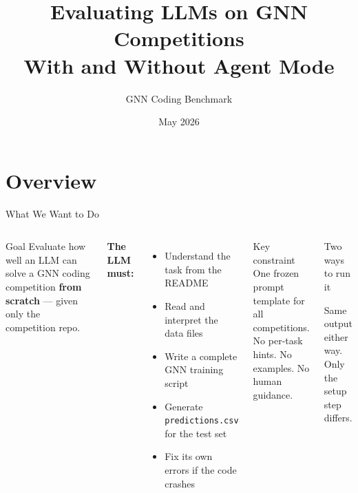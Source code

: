 \documentclass[aspectratio=169,t,10pt]{beamer}
\title[GNN-CB: LLM Evaluation Procedure]{%
  \textbf{Evaluating LLMs on GNN Competitions}\\[4pt]
  \normalsize With and Without Agent Mode}
\author[GNN-CB]{GNN Coding Benchmark}
\date{May 2026}
\institute[GNN-CB]{GNN Coding Benchmark}
\begin{document}

\begin{frame}[plain]
\titlepage
\end{frame}

\section{Overview}

\begin{frame}{What We Want to Do}

\begin{columns}[T]
\begin{block}{Goal}
Evaluate how well an LLM can solve a GNN coding competition
\textbf{from scratch} — given only the competition repo.
\end{block}

\vspace{6pt}
\textbf{The LLM must:}
\begin{itemize}\itemsep=3pt
  \item Understand the task from the README
  \item Read and interpret the data files
  \item Write a complete GNN training script
  \item Generate \texttt{predictions.csv} for the test set
  \item Fix its own errors if the code crashes
\end{itemize}

\vspace{6pt}
\begin{alertblock}{Key constraint}
One frozen prompt template for all competitions.\\
No per-task hints. No examples. No human guidance.
\end{alertblock}

\begin{block}{Two ways to run it}
\vspace{4pt}
\begin{center}
\end{center}
\vspace{4pt}
\textcolor{GNNgray}{\scriptsize Same output either way.\\Only the setup step differs.}
\end{block}
\end{columns}


\end{frame}
\end{document}
